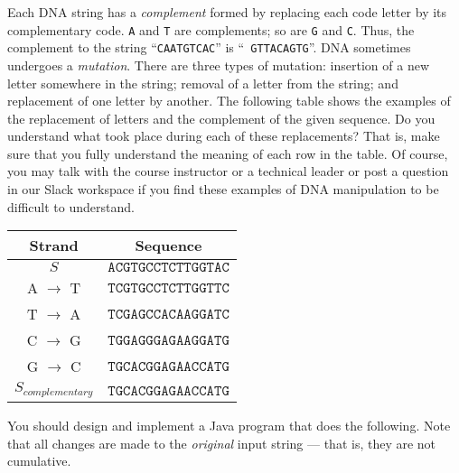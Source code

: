 \documentclass[11pt]{article}
\newcommand{\caution}[1]{\null\hfill\LARGE{\faWarning{}}\newline\scriptsize{\em{#1}}}
\begin{document}

Each DNA string has a {\em complement} formed by replacing each code letter by
its complementary code. {\tt A} and {\tt T} are complements; so are {\tt G} and
{\tt C}. Thus, the complement to the string ``{\tt CAATGTCAC}'' is ``{\tt
GTTACAGTG}''.  DNA sometimes undergoes a {\em mutation}. There are three types
of mutation: insertion of a new letter somewhere in the string; removal of a
letter from the string; and replacement of one letter by another. The following
table shows the examples of the replacement of letters and the complement of the
given sequence. Do you understand what took place during each of these
replacements? That is, make sure that you fully understand the meaning of each
row in the table. Of course, you may talk with the course instructor or a
technical leader or post a question in our Slack workspace if you find these
examples of DNA manipulation to be difficult to understand.

\begin{center}

\begin{tabular}{|cc|}
\hline
\textbf{Strand} & \textbf{Sequence}\\
\hline\hline
$S$      & $\mathtt{ACGTGCCTCTTGGTAC}$ \\
\hline
A $\to$ T &  $\mathtt{TCGTGCCTCTTGGTTC}$ \\
T $\to$ A &  $\mathtt{TCGAGCCACAAGGATC}$ \\
C $\to$ G &  $\mathtt{TGGAGGGAGAAGGATG}$ \\
G $\to$ C &  $\mathtt{TGCACGGAGAACCATG}$ \\
\hline
$S_{complementary}$ &  $\mathtt{TGCACGGAGAACCATG}$ \\
\hline
\end{tabular}
\end{center}

You should design and implement a Java program that does the following.  Note
that all changes are made to the {\em original} input string --- that is, they
are not cumulative.
\end{document}
